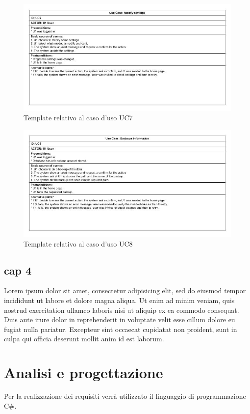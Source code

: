 \documentclass[a4paper,10pt]{report} %
\begin{document}
		\begin{figure}[htbp]
			\centering
			\includegraphics[width = \textwidth]{immagini/USE_CASE_TEMPLATE/UC07.jpg}
			\caption{Template relativo al caso d'uso UC7}
			\end{figure}
		\begin{figure}[htbp]
			\centering
			\includegraphics[width = \textwidth]{immagini/USE_CASE_TEMPLATE/UC08.jpg}
			\caption{Template relativo al caso d'uso UC8}
			\end{figure}
  \section{cap 4}
    Lorem ipsum dolor sit amet, consectetur adipisicing elit, sed do eiusmod tempor incididunt ut labore et dolore magna aliqua. Ut enim ad minim veniam, quis nostrud exercitation ullamco laboris nisi ut aliquip ex ea commodo consequat. Duis aute irure dolor in reprehenderit in voluptate velit esse cillum dolore eu fugiat nulla pariatur. Excepteur sint occaecat cupidatat non proident, sunt in culpa qui officia deserunt mollit anim id est laborum.
\newpage
\chapter{Analisi e progettazione} %
	Per la realizzazione dei requisiti verrà utilizzato il linguaggio di programmazione C#.
	
\end{document}
